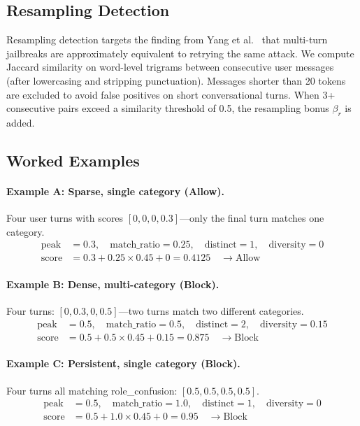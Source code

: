 \documentclass[11pt,a4paper]{article}
\begin{document}
\subsection{Resampling Detection}

Resampling detection targets the finding from Yang et
al.~\cite{yangsimpler} that multi-turn jailbreaks are approximately
equivalent to retrying the same attack. We compute Jaccard similarity on
word-level trigrams between consecutive user messages (after lowercasing
and stripping punctuation). Messages shorter than 20 tokens are excluded
to avoid false positives on short conversational turns. When 3+
consecutive pairs exceed a similarity threshold of 0.5, the resampling
bonus $\beta_r$ is added.

\subsection{Worked Examples}

\paragraph{Example A: Sparse, single category (Allow).}
Four user turns with scores $[0, 0, 0, 0.3]$---only the final turn
matches one category.
\begin{align*}
  \text{peak} &= 0.3, \quad \text{match\_ratio} = 0.25, \quad
  \text{distinct} = 1, \quad \text{diversity} = 0 \\
  \text{score} &= 0.3 + 0.25 \times 0.45 + 0 = \mathbf{0.4125}
  \quad \to \text{Allow}
\end{align*}

\paragraph{Example B: Dense, multi-category (Block).}
Four turns: $[0, 0.3, 0, 0.5]$---two turns match two different
categories.
\begin{align*}
  \text{peak} &= 0.5, \quad \text{match\_ratio} = 0.5, \quad
  \text{distinct} = 2, \quad \text{diversity} = 0.15 \\
  \text{score} &= 0.5 + 0.5 \times 0.45 + 0.15 = \mathbf{0.875}
  \quad \to \text{Block}
\end{align*}

\paragraph{Example C: Persistent, single category (Block).}
Four turns all matching role\_confusion: $[0.5, 0.5, 0.5, 0.5]$.
\begin{align*}
  \text{peak} &= 0.5, \quad \text{match\_ratio} = 1.0, \quad
  \text{distinct} = 1, \quad \text{diversity} = 0 \\
  \text{score} &= 0.5 + 1.0 \times 0.45 + 0 = \mathbf{0.95}
  \quad \to \text{Block}
\end{align*}
\end{document}
